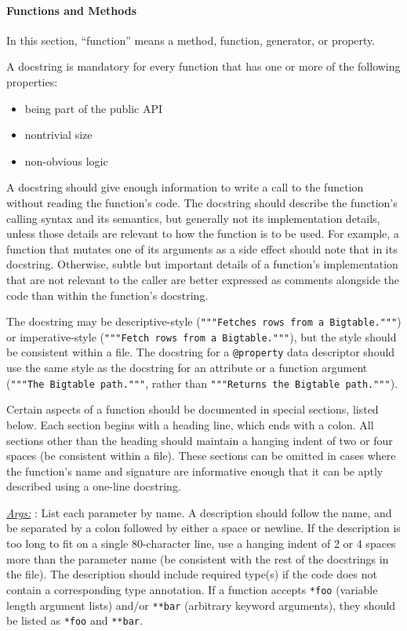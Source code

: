 \documentclass[
]{article}
\providecommand{\tightlist}{%
  \setlength{\itemsep}{0pt}\setlength{\parskip}{0pt}}
\begin{document}
\paragraph{Functions and Methods}

In this section, ``function'' means a method, function, generator, or
property.

A docstring is mandatory for every function that has one or more of the
following properties:

\begin{itemize}
\tightlist
\item
  being part of the public API
\item
  nontrivial size
\item
  non-obvious logic
\end{itemize}

A docstring should give enough information to write a call to the
function without reading the function's code. The docstring should
describe the function's calling syntax and its semantics, but generally
not its implementation details, unless those details are relevant to how
the function is to be used. For example, a function that mutates one of
its arguments as a side effect should note that in its docstring.
Otherwise, subtle but important details of a function's implementation
that are not relevant to the caller are better expressed as comments
alongside the code than within the function's docstring.

The docstring may be descriptive-style
(\texttt{"""Fetches\ rows\ from\ a\ Bigtable."""}) or imperative-style
(\texttt{"""Fetch\ rows\ from\ a\ Bigtable."""}), but the style should
be consistent within a file. The docstring for a \texttt{@property} data
descriptor should use the same style as the docstring for an attribute
or a function argument (\texttt{"""The\ Bigtable\ path."""}, rather than
\texttt{"""Returns\ the\ Bigtable\ path."""}).

Certain aspects of a function should be documented in special sections,
listed below. Each section begins with a heading line, which ends with a
colon. All sections other than the heading should maintain a hanging
indent of two or four spaces (be consistent within a file). These
sections can be omitted in cases where the function's name and signature
are informative enough that it can be aptly described using a one-line
docstring.

\hyperref[doc-function-args]{\emph{Args:}} : List each parameter by
name. A description should follow the name, and be separated by a colon
followed by either a space or newline. If the description is too long to
fit on a single 80-character line, use a hanging indent of 2 or 4 spaces
more than the parameter name (be consistent with the rest of the
docstrings in the file). The description should include required type(s)
if the code does not contain a corresponding type annotation. If a
function accepts \texttt{*foo} (variable length argument lists) and/or
\texttt{**bar} (arbitrary keyword arguments), they should be listed as
\texttt{*foo} and \texttt{**bar}.
\end{document}
